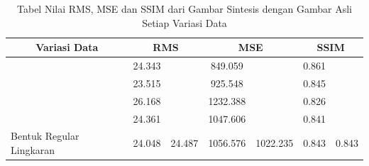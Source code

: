 \begin{table}[]
  \caption{Tabel Nilai RMS, MSE dan SSIM dari Gambar Sintesis dengan Gambar Asli Setiap Variasi Data}
  \label{tb:evaluasimatriks}
  \begin{tabular}{|l|cc|cc|cc|}
  \hline
  \multicolumn{1}{|c|}{Variasi Data}                  & \multicolumn{2}{c|}{RMS}                                                                               & \multicolumn{2}{c|}{MSE}                                                                                   & \multicolumn{2}{c|}{SSIM}                                                                            \\ \hline
                                                      & \multicolumn{1}{c|}{\cellcolor[HTML]{FFFFFF}24.343} & \cellcolor[HTML]{FFFFFF}                         & \multicolumn{1}{c|}{\cellcolor[HTML]{FFFFFF}849.059}  & \cellcolor[HTML]{FFFFFF}                           & \multicolumn{1}{c|}{\cellcolor[HTML]{FFFFFF}0.861} & \cellcolor[HTML]{FFFFFF}                        \\ \cline{2-2} \cline{4-4} \cline{6-6}
                                                      & \multicolumn{1}{c|}{\cellcolor[HTML]{FFFFFF}23.515} & \cellcolor[HTML]{FFFFFF}                         & \multicolumn{1}{c|}{\cellcolor[HTML]{FFFFFF}925.548}  & \cellcolor[HTML]{FFFFFF}                           & \multicolumn{1}{c|}{\cellcolor[HTML]{FFFFFF}0.845} & \cellcolor[HTML]{FFFFFF}                        \\ \cline{2-2} \cline{4-4} \cline{6-6}
                                                      & \multicolumn{1}{c|}{\cellcolor[HTML]{FFFFFF}26.168} & \cellcolor[HTML]{FFFFFF}                         & \multicolumn{1}{c|}{\cellcolor[HTML]{FFFFFF}1232.388} & \cellcolor[HTML]{FFFFFF}                           & \multicolumn{1}{c|}{\cellcolor[HTML]{FFFFFF}0.826} & \cellcolor[HTML]{FFFFFF}                        \\ \cline{2-2} \cline{4-4} \cline{6-6}
                                                      & \multicolumn{1}{c|}{\cellcolor[HTML]{FFFFFF}24.361} & \cellcolor[HTML]{FFFFFF}                         & \multicolumn{1}{c|}{\cellcolor[HTML]{FFFFFF}1047.606} & \cellcolor[HTML]{FFFFFF}                           & \multicolumn{1}{c|}{\cellcolor[HTML]{FFFFFF}0.841} & \cellcolor[HTML]{FFFFFF}                        \\ \cline{2-2} \cline{4-4} \cline{6-6}
  \multirow{-5}{*}{Bentuk Regular Lingkaran}          & \multicolumn{1}{c|}{\cellcolor[HTML]{FFFFFF}24.048} & \multirow{-5}{*}{\cellcolor[HTML]{FFFFFF}24.487} & \multicolumn{1}{c|}{\cellcolor[HTML]{FFFFFF}1056.576} & \multirow{-5}{*}{\cellcolor[HTML]{FFFFFF}1022.235} & \multicolumn{1}{c|}{\cellcolor[HTML]{FFFFFF}0.843} & \multirow{-5}{*}{\cellcolor[HTML]{FFFFFF}0.843} \\ \hline

\end{tabular}
\end{table}
